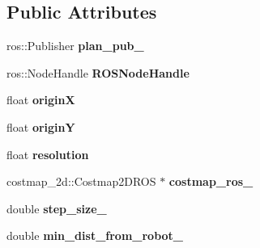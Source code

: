 \subsection*{Public Attributes}
\begin{DoxyCompactItemize}
\item 
ros\+::\+Publisher {\bfseries plan\+\_\+pub\+\_\+}\hypertarget{class_r_astar__planner_1_1_r_astar_planner_r_o_s_a53d1415cf583098e3e9444d6258e1677}{}\label{class_r_astar__planner_1_1_r_astar_planner_r_o_s_a53d1415cf583098e3e9444d6258e1677}

\item 
ros\+::\+Node\+Handle {\bfseries R\+O\+S\+Node\+Handle}\hypertarget{class_r_astar__planner_1_1_r_astar_planner_r_o_s_a7371972d6a02e857f3640b795c5ef11c}{}\label{class_r_astar__planner_1_1_r_astar_planner_r_o_s_a7371972d6a02e857f3640b795c5ef11c}

\item 
float {\bfseries originX}\hypertarget{class_r_astar__planner_1_1_r_astar_planner_r_o_s_ad2259dddb7800340bc6d5f89ebc4186b}{}\label{class_r_astar__planner_1_1_r_astar_planner_r_o_s_ad2259dddb7800340bc6d5f89ebc4186b}

\item 
float {\bfseries originY}\hypertarget{class_r_astar__planner_1_1_r_astar_planner_r_o_s_a94427d193482b1c34b3db7ae2bfb8155}{}\label{class_r_astar__planner_1_1_r_astar_planner_r_o_s_a94427d193482b1c34b3db7ae2bfb8155}

\item 
float {\bfseries resolution}\hypertarget{class_r_astar__planner_1_1_r_astar_planner_r_o_s_a651c37170c82d3b116961a9ba1ccea6e}{}\label{class_r_astar__planner_1_1_r_astar_planner_r_o_s_a651c37170c82d3b116961a9ba1ccea6e}

\item 
costmap\+\_\+2d\+::\+Costmap2\+D\+R\+OS $\ast$ {\bfseries costmap\+\_\+ros\+\_\+}\hypertarget{class_r_astar__planner_1_1_r_astar_planner_r_o_s_a7bec96cd0f94ecb17f98e206e46e461b}{}\label{class_r_astar__planner_1_1_r_astar_planner_r_o_s_a7bec96cd0f94ecb17f98e206e46e461b}

\item 
double {\bfseries step\+\_\+size\+\_\+}\hypertarget{class_r_astar__planner_1_1_r_astar_planner_r_o_s_ab9efb9a5f82f7c82c91f438c05a22c91}{}\label{class_r_astar__planner_1_1_r_astar_planner_r_o_s_ab9efb9a5f82f7c82c91f438c05a22c91}

\item 
double {\bfseries min\+\_\+dist\+\_\+from\+\_\+robot\+\_\+}\hypertarget{class_r_astar__planner_1_1_r_astar_planner_r_o_s_a0dc442aa982d3fdedb8dbbc22b28a470}{}\label{class_r_astar__planner_1_1_r_astar_planner_r_o_s_a0dc442aa982d3fdedb8dbbc22b28a470}


\end{DoxyCompactItemize}
